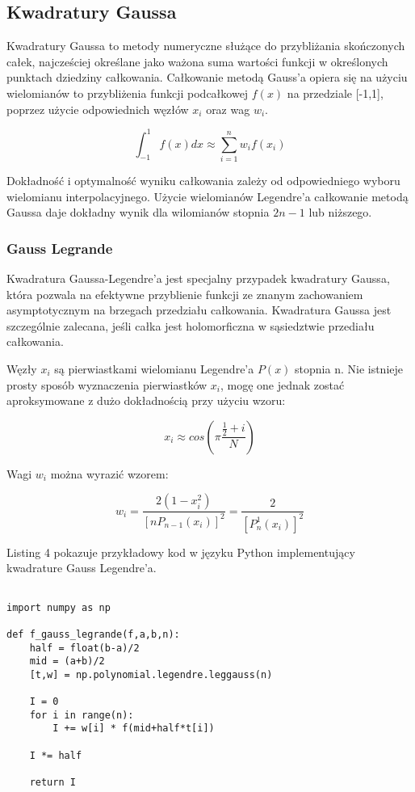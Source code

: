 \documentclass[12pt,twoside]{article}
\begin{document}
\subsection{Kwadratury Gaussa}
Kwadratury Gaussa to metody numeryczne służące do przybliżania skończonych całek, najcześciej określane jako ważona suma wartości funkcji w określonych punktach dziedziny całkowania.
Całkowanie metodą Gauss'a opiera się na użyciu wielomianów to przybliżenia funkcji podcałkowej $f(x)$ na przedziale [-1,1], poprzez użycie odpowiednich węzłów $x_i$ oraz wag $w_i$.
	
\begin{equation}
\int_{-1}^{1} f(x) dx \approx \sum_{i=1}^{n} w_if(x_i)
\label{Eq:rownanie}
\end{equation}

Dokładność i optymalność wyniku całkowania zależy od odpowiedniego wyboru wielomianu interpolacyjnego. Użycie wielomianów Legendre'a całkowanie metodą Gaussa daje dokładny wynik dla wilomianów stopnia $2n-1$ lub niższego. 


\subsubsection{Gauss Legrande}
Kwadratura Gaussa-Legendre'a jest specjalny przypadek kwadratury Gaussa, która pozwala na efektywne przyblienie funkcji ze znanym zachowaniem asymptotycznym na brzegach przedziału całkowania. Kwadratura Gaussa jest szczególnie zalecana, jeśli całka jest holomorficzna w sąsiedztwie przediału całkowania.

Węzły $x_i$ są pierwiastkami wielomianu Legendre'a $P(x)$ stopnia n. Nie istnieje prosty sposób wyznaczenia pierwiastków $x_i$, mogę one jednak zostać aproksymowane z dużo dokładnością przy użyciu wzoru:

\begin{equation}
x_i \approx cos(\pi \frac{\frac{1}{2}+i}{N})
\label{Eq:rownanie}
\end{equation}

Wagi $w_i$ można wyrazić wzorem:

\begin{equation}
w_i = \frac{2(1-x_i^2)}{[nP_{n-1}(x_i)]^2} = \frac{2}{[P_n^1(x_i)]^2}
\label{Eq:rownanie}
\end{equation}

\cite{point}


Listing 4 pokazuje przykładowy kod w języku Python implementujący kwadrature Gauss Legendre'a.

\begin{lstlisting}[caption={Kod w języku python implementujący metodę simpsona}]

import numpy as np

def f_gauss_legrande(f,a,b,n):
    half = float(b-a)/2
    mid = (a+b)/2
    [t,w] = np.polynomial.legendre.leggauss(n)

    I = 0
    for i in range(n):
        I += w[i] * f(mid+half*t[i])

    I *= half

    return I

\end{lstlisting}
\label{Listing 4}
\end{document}
